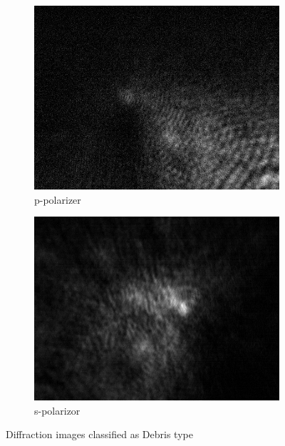 \begin{figure}[!h]
\begin{subfigure}[b]{0.2\textwidth}
    \includegraphics[width=\textwidth]{diffraction_image/2015040117594700050-1}
    \caption{p-polarizer}
  \end{subfigure}
  \begin{subfigure}[b]{0.2\textwidth}
    \includegraphics[width=\textwidth]{diffraction_image/2015040117594700050-2}
    \caption{s-polarizor}
  \end{subfigure}
  \caption{Diffraction images classified as Debris type}
\end{figure}
